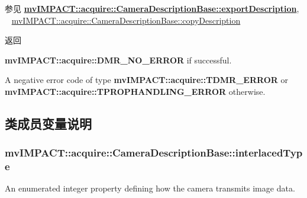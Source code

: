 \begin{DoxySeeAlso}{参见}
{\bfseries \hyperlink{classmv_i_m_p_a_c_t_1_1acquire_1_1_camera_description_base_a75ca8307f89a995695a8331f8a6ba463}{mv\+I\+M\+P\+A\+C\+T\+::acquire\+::\+Camera\+Description\+Base\+::export\+Description}}, ~\newline
 \hyperlink{classmv_i_m_p_a_c_t_1_1acquire_1_1_camera_description_base_ab449bcb1f45d79f311728d22b4e60369}{mv\+I\+M\+P\+A\+C\+T\+::acquire\+::\+Camera\+Description\+Base\+::copy\+Description} 
\end{DoxySeeAlso}
\begin{DoxyReturn}{返回}

\begin{DoxyItemize}
\item {\bfseries mv\+I\+M\+P\+A\+C\+T\+::acquire\+::\+D\+M\+R\+\_\+\+N\+O\+\_\+\+E\+R\+R\+O\+R} if successful.
\item A negative error code of type {\bfseries mv\+I\+M\+P\+A\+C\+T\+::acquire\+::\+T\+D\+M\+R\+\_\+\+E\+R\+R\+O\+R} or {\bfseries mv\+I\+M\+P\+A\+C\+T\+::acquire\+::\+T\+P\+R\+O\+P\+H\+A\+N\+D\+L\+I\+N\+G\+\_\+\+E\+R\+R\+O\+R} otherwise. 
\end{DoxyItemize}
\end{DoxyReturn}


\subsection{类成员变量说明}
\hypertarget{classmv_i_m_p_a_c_t_1_1acquire_1_1_camera_description_base_accd697662a91ec66a710677104ab1fe1}{
\subsubsection[{interlaced\+Type}]{ mv\+I\+M\+P\+A\+C\+T\+::acquire\+::\+Camera\+Description\+Base\+::interlaced\+Type}}\label{classmv_i_m_p_a_c_t_1_1acquire_1_1_camera_description_base_accd697662a91ec66a710677104ab1fe1}


An enumerated integer property defining how the camera transmits image data. 

